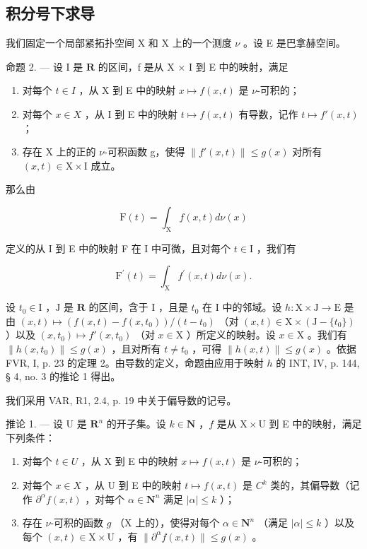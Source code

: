 \subsection{积分号下求导}

我们固定一个局部紧拓扑空间 X 和 X 上的一个测度 \(\nu\) 。设 E 是巴拿赫空间。

命题 2. --- 设 I 是 \(\mathbf{R}\) 的区间，f 是从 X × I 到 E 中的映射，满足

\begin{enumerate}
\def\labelenumi{(\roman{enumi})}
\item
  对每个 \(t \in I\) ，从 X 到 E 中的映射 \(x \mapsto f(x, t)\) 是 \(\nu\)-可积的；
\item
  对每个 \(x \in X\) ，从 I 到 E 中的映射 \(t \mapsto f(x, t)\) 有导数，记作 \(t \mapsto f'(x, t)\) ；
\item
  存在 X 上的正的 \(\nu\)-可积函数 g，使得 \(\|f'(x,t)\| \leqslant g(x)\) 对所有 \((x,t) \in \mathrm{X} \times \mathrm{I}\) 成立。
\end{enumerate}

那么由

\[
\mathrm{F} (t) = \int_ {\mathrm{X}} f (x, t) d \nu (x)
\]

定义的从 I 到 E 中的映射 F 在 I 中可微，且对每个 \(t \in \mathrm{I}\) ，我们有

\[
\mathrm{F} ^ {\prime} (t) = \int_ {\mathrm{X}} f ^ {\prime} (x, t) d \nu (x).
\]

设 \(t_0 \in \mathrm{I}\) ，\(\mathrm{J}\) 是 \(\mathbf{R}\) 的区间，含于 \(\mathrm{I}\) ，且是 \(t_0\) 在 \(\mathrm{I}\) 中的邻域。设 \(h: \mathrm{X} \times \mathrm{J} \to \mathrm{E}\) 是由 \((x, t) \mapsto (f(x, t) - f(x, t_0)) / (t - t_0)\) （对 \((x, t) \in \mathrm{X} \times (\mathrm{J} - \{t_0\})\) ）以及 \((x, t_0) \mapsto f'(x, t_0)\) （对 \(x \in \mathrm{X}\) ）所定义的映射。设 \(x \in \mathrm{X}\) 。我们有 \(\|h(x, t_0)\| \leqslant g(x)\) ，且对所有 \(t \neq t_0\) ，可得 \(\|h(x, t)\| \leqslant g(x)\) 。依据 FVR, I, p. 23 的定理 2。由导数的定义，命题由应用于映射 \(h\) 的 INT, IV, p. 144, § 4, no. 3 的推论 1 得出。

我们采用 VAR, R1, 2.4, p. 19 中关于偏导数的记号。

推论 1. --- 设 U 是 \(\mathbf{R}^{n}\) 的开子集。设 \(k \in \mathbf{N}\) ，\(f\) 是从 \(\mathrm{X} \times \mathrm{U}\) 到 E 中的映射，满足下列条件：

\begin{enumerate}
\def\labelenumi{(\roman{enumi})}
\item
  对每个 \(t \in U\) ，从 X 到 E 中的映射 \(x \mapsto f(x, t)\) 是 \(\nu\)-可积的；
\item
  对每个 \(x \in X\) ，从 U 到 E 中的映射 \(t \mapsto f(x, t)\) 是 \(C^{k}\) 类的，其偏导数（记作 \(\partial^{\alpha}f(x, t)\) ，对每个 \(\alpha \in \mathbf{N}^{n}\) 满足 \(|\alpha| \leqslant k\) ）；
\item
  存在 \(\nu\)-可积的函数 \(g\) （X 上的），使得对每个 \(\alpha \in \mathbf{N}^n\) （满足 \(|\alpha| \leqslant k\) ）以及每个 \((x,t) \in \mathrm{X} \times \mathrm{U}\) ，有 \(\|\partial^\alpha f(x,t)\| \leqslant g(x)\) 。
\end{enumerate}

